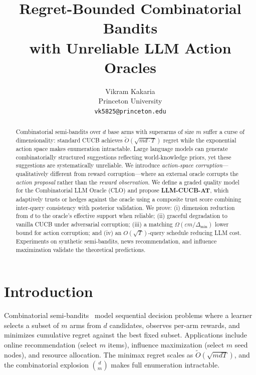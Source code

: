\documentclass{article}
\title{Regret-Bounded Combinatorial Bandits\\with Unreliable LLM Action Oracles}
\author{
  Vikram Kakaria \\
  Princeton University \\
  \texttt{vk5825@princeton.edu}
}
\begin{document}
\maketitle

\begin{abstract}
Combinatorial semi-bandits over $d$ base arms with superarms of size $m$ suffer a curse of dimensionality: standard CUCB achieves $\tilde{O}(\sqrt{md \cdot T})$ regret while the exponential action space makes enumeration intractable.
Large language models can generate combinatorially structured suggestions reflecting world-knowledge priors, yet these suggestions are systematically unreliable.
We introduce \emph{action-space corruption}---qualitatively different from reward corruption---where an external oracle corrupts the \emph{action proposal} rather than the \emph{reward observation}.
We define a graded quality model for the Combinatorial LLM Oracle (CLO) and propose \textbf{LLM-CUCB-AT}, which adaptively trusts or hedges against the oracle using a composite trust score combining inter-query consistency with posterior validation.
We prove: (i) dimension reduction from $d$ to the oracle's effective support when reliable; (ii) graceful degradation to vanilla CUCB under adversarial corruption; (iii) a matching $\Omega(\varepsilon m / \Delta_{\min})$ lower bound for action corruption; and (iv) an $O(\sqrt{T})$-query schedule reducing LLM cost.
Experiments on synthetic semi-bandits, news recommendation, and influence maximization validate the theoretical predictions.
\end{abstract}

\section{Introduction}
\label{sec:intro}

Combinatorial semi-bandits~\citep{chen2013combinatorial,kveton2015tight} model sequential decision problems where a learner selects a subset of $m$ arms from $d$ candidates, observes per-arm rewards, and minimizes cumulative regret against the best fixed subset.
Applications include online recommendation (select $m$ items), influence maximization (select $m$ seed nodes), and resource allocation.
The minimax regret scales as $\tilde{O}(\sqrt{mdT})$, and the combinatorial explosion $\binom{d}{m}$ makes full enumeration intractable.
\end{document}
